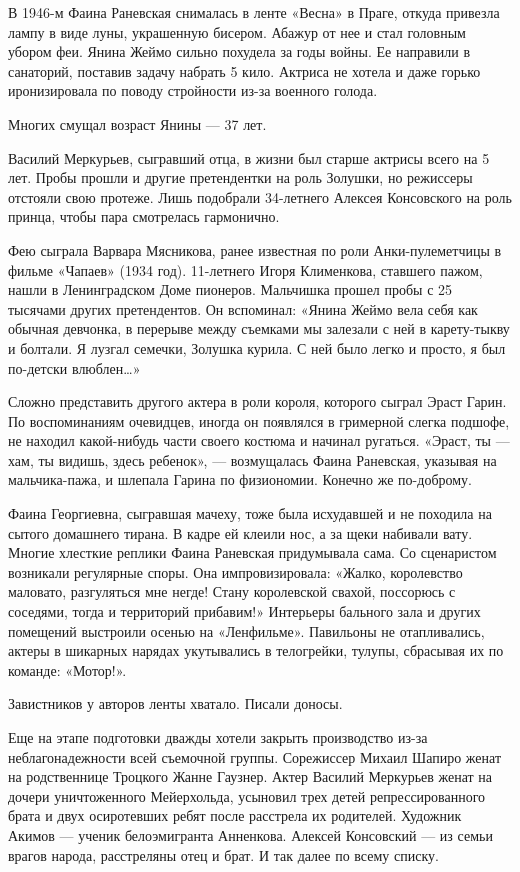 В 1946-м Фаина Раневская снималась в ленте «Весна» в Праге, откуда привезла
лампу в виде луны, украшенную бисером. Абажур от нее и стал головным убором
феи.  Янина Жеймо сильно похудела за годы войны. Ее направили в санаторий,
поставив задачу набрать 5 кило. Актриса не хотела и даже горько иронизировала
по поводу стройности из-за военного голода.

Многих смущал возраст Янины --- 37 лет.

Василий Меркурьев, сыгравший отца, в жизни был старше актрисы всего на 5 лет.
Пробы прошли и другие претендентки на роль Золушки, но режиссеры отстояли свою
протеже. Лишь подобрали 34-летнего Алексея Консовского на роль принца, чтобы
пара смотрелась гармонично.

Фею сыграла Варвара Мясникова, ранее известная по роли Анки-пулеметчицы в
фильме «Чапаев» (1934 год). 11-летнего Игоря Клименкова, ставшего пажом, нашли
в Ленинградском Доме пионеров. Мальчишка прошел пробы с 25 тысячами других
претендентов. Он вспоминал: «Янина Жеймо вела себя как обычная девчонка, в
перерыве между съемками мы залезали с ней в карету-тыкву и болтали. Я лузгал
семечки, Золушка курила. С ней было легко и просто, я был по-детски влюблен…»

Сложно представить другого актера в роли короля, которого сыграл Эраст Гарин.
По воспоминаниям очевидцев, иногда он появлялся в гримерной слегка подшофе, не
находил какой-нибудь части своего костюма и начинал ругаться. «Эраст, ты --- хам,
ты видишь, здесь ребенок», --- возмущалась Фаина Раневская, указывая на
мальчика-пажа, и шлепала Гарина по физиономии. Конечно же по-доброму.

Фаина Георгиевна, сыгравшая мачеху, тоже была исхудавшей и не походила на
сытого домашнего тирана. В кадре ей клеили нос, а за щеки набивали вату. Многие
хлесткие реплики Фаина Раневская придумывала сама. Со сценаристом возникали
регулярные споры. Она импровизировала: «Жалко, королевство маловато,
разгуляться мне негде! Стану королевской свахой, поссорюсь с соседями, тогда и
территорий прибавим!» Интерьеры бального зала и других помещений выстроили
осенью на «Ленфильме». Павильоны не отапливались, актеры в шикарных нарядах
укутывались в телогрейки, тулупы, сбрасывая их по команде: «Мотор!».

Завистников у авторов ленты хватало. Писали доносы.

Еще на этапе подготовки дважды хотели закрыть производство из-за
неблагонадежности всей съемочной группы. Сорежиссер Михаил Шапиро женат на
родственнице Троцкого Жанне Гаузнер. Актер Василий Меркурьев женат на дочери
уничтоженного Мейерхольда, усыновил трех детей репрессированного брата и двух
осиротевших ребят после расстрела их родителей. Художник Акимов --- ученик
белоэмигранта Анненкова. Алексей Консовский --- из семьи врагов народа,
расстреляны отец и брат. И так далее по всему списку.

